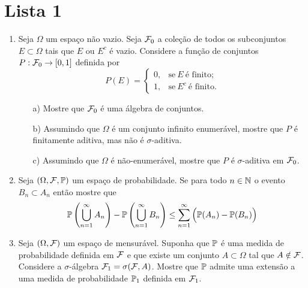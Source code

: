 \chapter*{Lista 1}
\chaptermark{}

\begin{enumerate}[leftmargin=*]


\item 
Seja $\Omega$ um espaço não vazio. 
Seja $\F_0$ a coleção de todos os 
subconjuntos $E\subset\Omega$ 
tais que $E$ ou $E^c$ é vazio.
Considere a função de conjuntos $P:\F_0\to [0,1]$
definida por 
	\[
		P(E) =
		\begin{cases}
		0,&\text{se}\ E \ \text{é finito};
		\\
		1,&\text{se}\ E^c \ \text{é finito}.
		\end{cases}
	\]
	\begin{itemize}
		\item[a)]
		Mostre que $\F_0$ é uma álgebra de conjuntos.
		
		\item[b)] 
		Assumindo que $\Omega$ é um conjunto infinito enumerável,
		mostre que $P$ é finitamente aditiva, mas não é $\sigma$-aditiva.
		
		\item[c)]
		Assumindo que $\Omega$ é não-enumerável, mostre que $P$ 
		é $\sigma$-aditiva em $\F_0$.
		
	\end{itemize}





\item 
Seja $(\Omega,\F,\P)$ um espaço de probabilidade.
Se para todo $n\in\N$ o evento 
$B_n\subset A_n$ então mostre que 
	\[
		\P\left( \bigcup_{n=1}^{\infty} A_n \right)
		-\P\left( \bigcup_{n=1}^{\infty} B_n  \right)	
		\leq 
		\sum_{n=1}^{\infty} \Big( \P(A_n)-\P(B_n) \Big)	
	\]





\item 
Seja $(\Omega,\F)$ um espaço de mensurável. 
Suponha que $\P$ é uma medida de probabilidade
definida em $\F$ e que existe um conjunto $A\subset\Omega$
tal que $A\notin\F$. Considere a $\sigma$-álgebra 
$\F_1 = \sigma(\F,A)$. Mostre que $\P$ admite uma extensão 
a uma medida de probabilidade $\P_1$ definida em $\F_1$. 






\end{enumerate}
